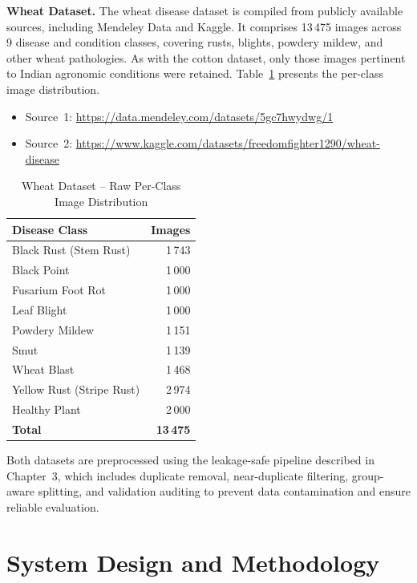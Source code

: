\documentclass[12pt,a4paper]{report}
\begin{document}
\textbf{Wheat Dataset.} The wheat disease dataset is compiled from publicly available sources, including Mendeley Data and Kaggle. It comprises 13\,475 images across 9 disease and condition classes, covering rusts, blights, powdery mildew, and other wheat pathologies. As with the cotton dataset, only those images pertinent to Indian agronomic conditions were retained. Table~\ref{tab:wheat-raw} presents the per-class image distribution.
\begin{itemize}
    \item Source~1: \url{https://data.mendeley.com/datasets/5gc7hwydwg/1}
    \item Source~2: \url{https://www.kaggle.com/datasets/freedomfighter1290/wheat-disease}
\end{itemize}

\begin{table}[H]
\centering
\caption{Wheat Dataset -- Raw Per-Class Image Distribution}
\label{tab:wheat-raw}
\begin{tabular}{lr}
\toprule
Disease Class & Images \\
\midrule
Black Rust (Stem Rust) & 1\,743 \\
Black Point & 1\,000 \\
Fusarium Foot Rot & 1\,000 \\
Leaf Blight & 1\,000 \\
Powdery Mildew & 1\,151 \\
Smut & 1\,139 \\
Wheat Blast & 1\,468 \\
Yellow Rust (Stripe Rust) & 2\,974 \\
Healthy Plant & 2\,000 \\
\midrule
\textbf{Total} & \textbf{13\,475} \\
\bottomrule
\end{tabular}
\end{table}

Both datasets are preprocessed using the leakage-safe pipeline described in Chapter~3, which includes duplicate removal, near-duplicate filtering, group-aware splitting, and validation auditing to prevent data contamination and ensure reliable evaluation.

\chapter{System Design and Methodology}
\end{document}

